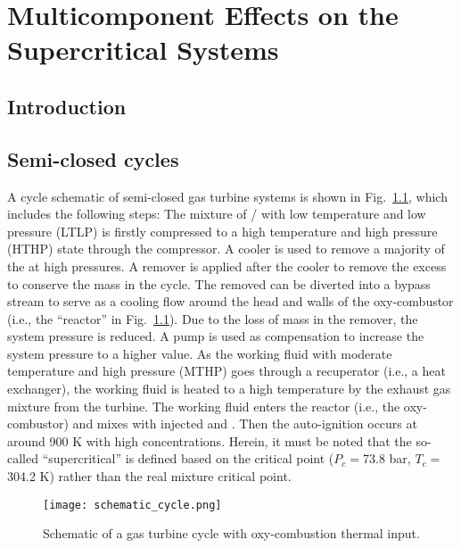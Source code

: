 \chapter{Multicomponent Effects on the Supercritical  Systems}

\section{Introduction}


\section{Semi-closed  cycles} \label{app:sCO2cycle}
    A cycle schematic of semi-closed  gas turbine systems is shown in Fig.~\ref{fig1}, which includes the following steps: The mixture of / with low temperature and low pressure (LTLP) is firstly compressed to a high temperature and high pressure (HTHP) state through the compressor. A cooler is used to remove a majority of the  at high pressures. %
    A remover is applied after the cooler to remove the excess  to conserve the mass in the cycle. The removed  can be diverted into a bypass stream to serve as a cooling flow around the head and walls of the oxy-combustor (i.e., the ``reactor'' in Fig.~\ref{fig1}). Due to the loss of mass in the remover, the system pressure is reduced. A pump is used as compensation to increase the system pressure to a higher value. As the working fluid with moderate temperature and high pressure (MTHP) goes through a recuperator (i.e., a heat exchanger), the working fluid is heated to a high temperature by the exhaust gas mixture from the turbine. The working fluid enters the reactor (i.e., the oxy-combustor) and mixes with injected  and . Then the auto-ignition occurs at around 900 K with high  concentrations. Herein, it must be noted that the so-called ``supercritical'' is defined based on the  critical point ($P_c=$73.8 bar, $T_c=$304.2 K) rather than the real mixture critical point.
    \begin{figure}[htbp]
        \begin{center}
            \texttt{[image: schematic\_cycle.png]}
        \end{center}
        \caption{Schematic of a  gas turbine cycle with oxy-combustion thermal input.}
        \label{fig1}
    \end{figure}


